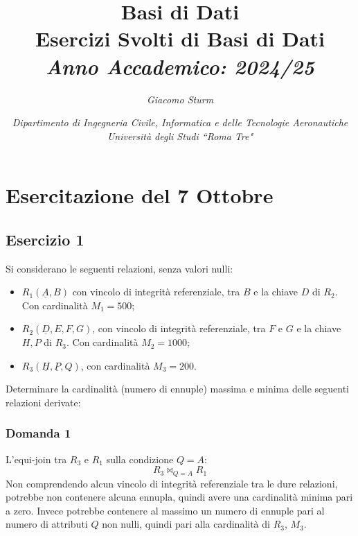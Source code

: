 \documentclass{article}
\numberwithin{equation}{subsection}
\begin{document}
\title{%
    \textbf{Basi di Dati}  \\ 
    \large Esercizi Svolti di Basi di Dati \\
    \textit{Anno Accademico: 2024/25}}
\author{\textit{Giacomo Sturm}}
\date{\textit{Dipartimento di Ingegneria Civile, Informatica e delle Tecnologie Aeronautiche \\
Università degli Studi ``Roma Tre"}}

\maketitle
\thispagestyle{link}

\clearpage


\pagestyle{fancy}
\fancyhead{}\fancyfoot{}
\fancyfoot[C]{\thepage}

\tableofcontents

\clearpage
{}

\section{Esercitazione del 7 Ottobre}

\subsection{Esercizio 1}

Si considerano le seguenti relazioni, senza valori nulli:
\begin{itemize}
    \item $R_1(\underline{A},B)$ con vincolo di integrità referenziale, tra $B$ e la chiave $D$ di $R_2$. Con cardinalità $M_1=500$;
    \item $R_2(\underline{D},E,F,G)$, con vincolo di integrità referenziale, tra $F$ e $G$ e la chiave $H,P$ di $R_3$. Con cardinalità $M_2=1000$;
    \item $R_3(\underline{H},\underline{P},Q)$, con cardinalità $M_3=200$.
\end{itemize}

Determinare la cardinalità (numero di ennuple) massima e minima delle seguenti relazioni derivate:

\subsubsection*{Domanda 1}

L'equi-join tra $R_3$ e $R_1$ sulla condizione $Q=A$:
\begin{equation*}
    R_3\Join_{Q=A}R_1
\end{equation*}
Non comprendendo alcun vincolo di integrità referenziale tra le dure relazioni, potrebbe non contenere alcuna ennupla, quindi avere una cardinalità minima pari a zero. 
Invece potrebbe contenere al massimo un numero di ennuple pari al numero di attributi $Q$ non nulli, quindi pari alla cardinalità di $R_3$, $M_3$. 
\end{document}
